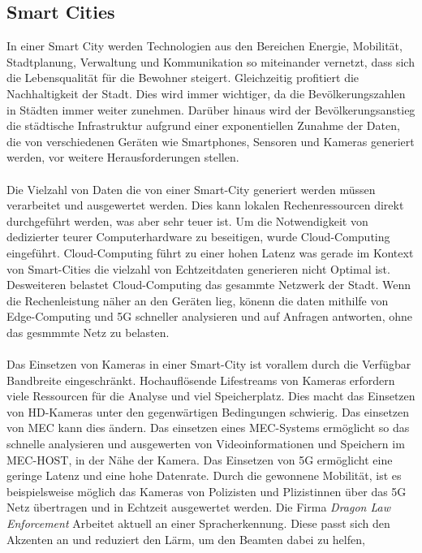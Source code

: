 \documentclass[runningheads]{llncs}
\numberwithin{figure}{section}
\begin{document}
\subsection{Smart Cities}
\label{subsec:Smart Cities}
In einer Smart City werden Technologien aus den Bereichen Energie, Mobilität, Stadtplanung, 
Verwaltung und Kommunikation so miteinander vernetzt, dass sich die Lebensqualität für die Bewohner steigert. 
Gleichzeitig profitiert die Nachhaltigkeit der Stadt. Dies wird immer wichtiger, da die Bevölkerungszahlen in 
Städten immer weiter zunehmen.
Darüber hinaus wird der Bevölkerungsanstieg die städtische Infrastruktur aufgrund einer 
exponentiellen Zunahme der Daten, die von verschiedenen Geräten wie Smartphones, Sensoren und Kameras generiert werden, 
vor weitere Herausforderungen stellen. 
\\
\\
Die Vielzahl von Daten die von einer Smart-City generiert werden müssen verarbeitet und ausgewertet werden. Dies kann lokalen Rechenressourcen
direkt durchgeführt werden, was aber sehr teuer ist. 
Um die Notwendigkeit von dedizierter teurer Computerhardware zu beseitigen, wurde Cloud-Computing eingeführt. Cloud-Computing führt
zu einer hohen Latenz was gerade im Kontext von Smart-Cities die vielzahl von Echtzeitdaten generieren nicht Optimal ist.
Desweiteren belastet Cloud-Computing das gesammte Netzwerk der Stadt. 
Wenn die Rechenleistung näher an den Geräten lieg, könenn die daten mithilfe von Edge-Computing und 5G schneller analysieren 
und auf Anfragen antworten, ohne das gesmmmte Netz zu belasten.
\\
\\
Das Einsetzen von Kameras in einer Smart-City ist vorallem durch die Verfügbar Bandbreite eingeschränkt. 
Hochauflösende Lifestreams von Kameras erfordern viele Ressourcen für die Analyse und viel Speicherplatz. 
Dies macht das Einsetzen von HD-Kameras unter den gegenwärtigen Bedingungen schwierig.
Das einsetzen von MEC kann dies ändern. Das einsetzen eines MEC-Systems ermöglicht so das schnelle analysieren und ausgewerten von
Videoinformationen und Speichern im MEC-HOST, in der Nähe der Kamera. Das Einsetzen von 5G ermöglicht eine geringe Latenz und eine 
hohe Datenrate. Durch die gewonnene Mobilität, ist es beispielsweise möglich das Kameras von Polizisten und Plizistinnen über das 5G Netz
übertragen und in Echtzeit ausgewertet werden. Die Firma \textit{Dragon Law Enforcement} Arbeitet aktuell an einer Spracherkennung.
Diese passt sich den Akzenten an und reduziert den Lärm, um den Beamten dabei zu helfen, 
\end{document}
